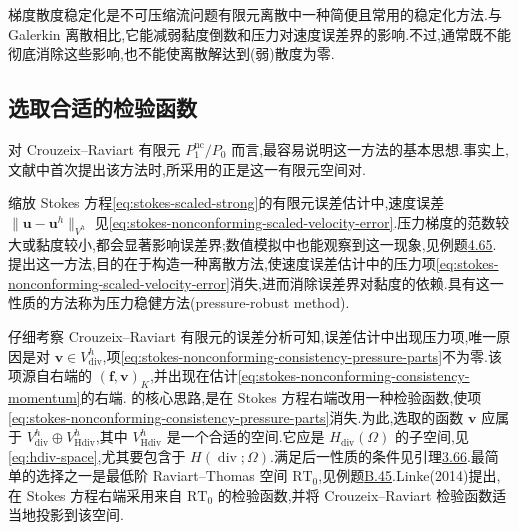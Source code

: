 \begin{note}[小结]\label{note:stokes-grad-div-summary}
梯度散度稳定化是不可压缩流问题有限元离散中一种简便且常用的稳定化方法.与 Galerkin 离散相比,它能减弱黏度倒数和压力对速度误差界的影响.不过,通常既不能彻底消除这些影响,也不能使离散解达到(弱)散度为零.
\end{note}

\subsection{选取合适的检验函数}\label{subsec:stokes-appropriate-test-functions}

\begin{note}[目标与思路]\label{note:stokes-pressure-robust-goal-idea}
对 Crouzeix--Raviart 有限元 $P_1^{\mathrm{nc}}/P_0$ 而言,最容易说明这一方法的基本思想.事实上,文献中首次提出该方法时,所采用的正是这一有限元空间对\textcite{Linke2014}.

缩放 Stokes 方程\cref{eq:stokes-scaled-strong}的有限元误差估计中,速度误差 $\|\bm{u}-\bm{u}^h\|_{V^h}$ 见\cref{eq:stokes-nonconforming-scaled-velocity-error}.压力梯度的范数较大或黏度较小,都会显著影响误差界;数值模拟中也能观察到这一现象,见例题\hyperref[ex:stokes-scaled-analytic-lowest-order]{4.65}.\textcite{Linke2014} 提出这一方法,目的在于构造一种离散方法,使速度误差估计中的压力项\cref{eq:stokes-nonconforming-scaled-velocity-error}消失,进而消除误差界对黏度的依赖.具有这一性质的方法称为压力稳健方法(pressure-robust method).

仔细考察 Crouzeix--Raviart 有限元的误差分析可知,误差估计中出现压力项,唯一原因是对 $\bm{v}\in V_{\mathrm{div}}^h$,项\cref{eq:stokes-nonconforming-consistency-pressure-parts}不为零.该项源自右端的 $(\bm{f},\bm{v})_K$,并出现在估计\cref{eq:stokes-nonconforming-consistency-momentum}的右端.\textcite{Linke2014} 的核心思路,是在 Stokes 方程右端改用一种检验函数,使项\cref{eq:stokes-nonconforming-consistency-pressure-parts}消失.为此,选取的函数 $\bm{v}$ 应属于
$V_{\mathrm{div}}^h\oplus V_{\mathrm{Hdiv}}^h$,其中 $V_{\mathrm{Hdiv}}^h$ 是一个合适的空间.它应是 $H_{\mathrm{div}}(\Omega)$ 的子空间,见\cref{eq:hdiv-space},尤其要包含于 $H(\operatorname{div};\Omega)$.满足后一性质的条件见引理\hyperref[lem:piecewise-polynomial-hdiv]{3.66}.最简单的选择之一是最低阶 Raviart--Thomas 空间 $\mathrm{RT}_0$,见例题\hyperref[ex:appendix-b-45]{B.45}.Linke(2014)提出,在 Stokes 方程右端采用来自 $\mathrm{RT}_0$ 的检验函数,并将 Crouzeix--Raviart 检验函数适当地投影到该空间.
\end{note}

